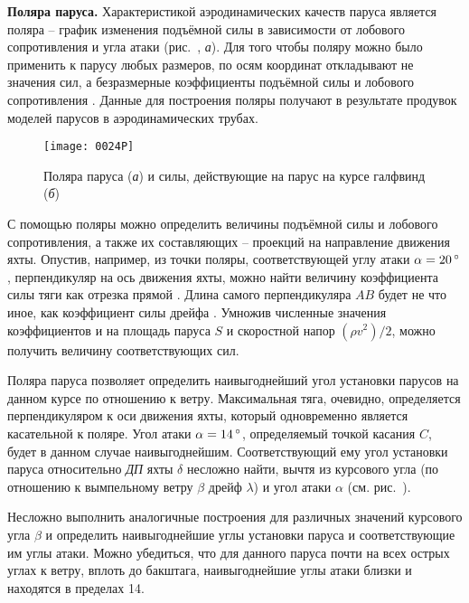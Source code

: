 \textbf{Поляра паруса.}
Характеристикой аэродинамических качеств паруса является поляра \---
график изменения подъёмной силы в зависимости от лобового
сопротивления и угла атаки (рис.~, \textit{а}). Для того чтобы
поляру можно было применить к парусу любых размеров, по осям координат
откладывают не значения сил, а безразмерные коэффициенты подъёмной
силы  и лобового сопротивления . Данные для
построения поляры получают в результате продувок моделей парусов в
аэродинамических трубах.

\begin{figure}[htb]
  \centering
  \texttt{[image: 0024P]}
  \caption{Поляра паруса (\textit{а}) и силы, действующие на парус на курсе галфвинд (\textit{б})}
  \label{fig:24}
\end{figure}

С помощью поляры можно определить величины подъёмной силы и лобового
сопротивления, а также их составляющих \--- проекций на направление
движения яхты. Опустив, например, из точки поляры, соответствующей
углу атаки $\alpha = 20\,^\circ$, перпендикуляр на ось движения яхты, можно
найти величину коэффициента силы тяги  как отрезка прямой
. Длина самого перпендикуляра $AB$ будет не что иное, как
коэффициент силы дрейфа . Умножив численные значения
коэффициентов  и  на площадь паруса $S$ и
скоростной напор $(\rho v^2)/2$, можно получить величину
соответствующих сил.

Поляра паруса позволяет определить наивыгоднейший угол установки
парусов на данном курсе по отношению к ветру. Максимальная тяга,
очевидно, определяется перпендикуляром к оси движения яхты, который
одновременно является касательной к поляре. Угол атаки
$\alpha = 14\,^\circ$, определяемый точкой касания $C$, будет в данном
случае наивыгоднейшим. Соответствующий ему угол установки паруса
относительно \textit{ДП} яхты $\delta$ несложно найти, вычтя из
курсового угла (по отношению к вымпельному ветру $\beta$ дрейф
$\lambda$) и угол атаки $\alpha$ (см. рис.~).

Несложно выполнить аналогичные построения для различных значений
курсового угла $\beta$ и определить наивыгоднейшие углы установки
паруса и соответствующие им углы атаки. Можно убедиться, что для
данного паруса почти на всех острых углах к ветру, вплоть до бакштага,
наивыгоднейшие углы атаки близки и находятся в пределах 14\gr.

